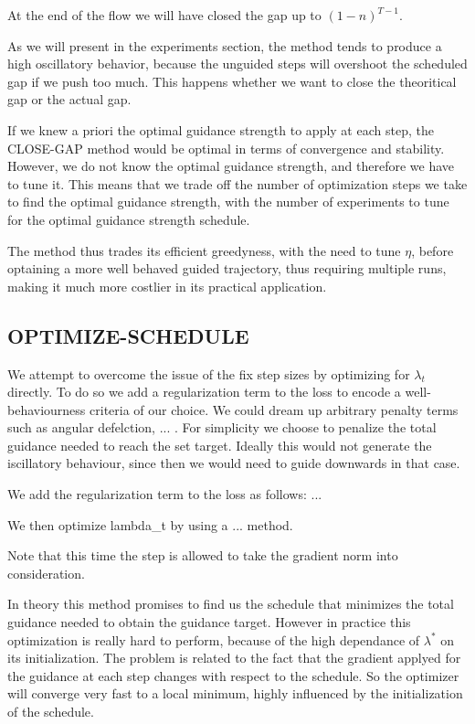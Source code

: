 At the end of the flow we will have closed the gap up to $(1-n)^{T-1}$.

As we will present in the experiments section, the method tends to produce a high oscillatory behavior, because the unguided steps will overshoot the scheduled gap if we push too much.
This happens whether we want to close the theoritical gap or the actual gap.

If we knew a priori the optimal guidance strength to apply at each step, the CLOSE-GAP method would be optimal in terms of convergence and stability.
However, we do not know the optimal guidance strength, and therefore we have to tune it.
This means that we trade off the number of optimization steps we take to find the optimal guidance strength, with the number of experiments to tune for the optimal guidance strength schedule.

The method thus trades its efficient greedyness, with the need to tune $\eta$, before optaining a more well behaved guided trajectory, thus requiring multiple runs, making it much more costlier in its practical application.

\subsection{OPTIMIZE-SCHEDULE}

We attempt to overcome the issue of the fix step sizes by optimizing for $\lambda_t$ directly.
To do so we add a regularization term to the loss to encode a well-behaviourness criteria of our choice.
We could dream up arbitrary penalty terms such as angular defelction, ... .
For simplicity we choose to penalize the total guidance needed to reach the set target.
Ideally this would not generate the iscillatory behaviour, since then we would need to guide downwards in that case.

We add the regularization term to the loss as follows:
...

We then optimize lambda\_t by using a ... method.

Note that this time the step is allowed to take the gradient norm into consideration.

In theory this method promises to find us the schedule that minimizes the total guidance needed to obtain the guidance target.
However in practice this optimization is really hard to perform, because of the high dependance of $\lambda^*$ on its initialization. 
The problem is related to the fact that the gradient applyed for the guidance at each step changes with respect to the schedule.
So the optimizer will converge very fast to a local minimum, highly influenced by the initialization of the schedule.

